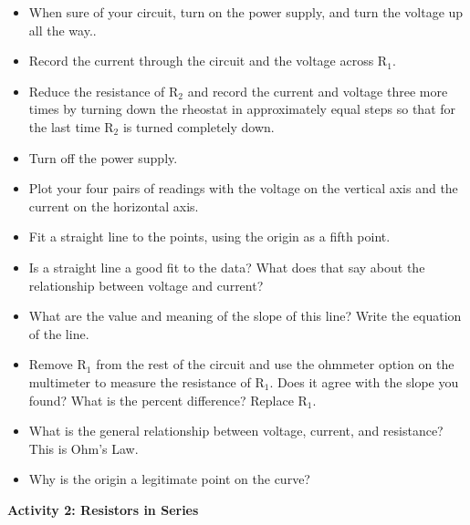 \begin{itemize}
\item When sure of your circuit, turn on the power supply, and turn
the voltage up all the way..
\item Record the current through the circuit and the voltage across R\( _{1} \).\vspace{10mm}

\item Reduce the resistance of R\( _{2} \) and record the current and voltage
three more times by turning down the rheostat in approximately equal
steps so that for the last time R\( _{2} \) is turned completely down.\vspace{30mm}

\item Turn off the power supply.
\item Plot your four pairs of readings with the voltage on the vertical axis
and the current on the horizontal axis.
\item Fit a straight line to the points, using the origin as a fifth point.
\item Is a straight line a good fit to the data? What does that say about
the relationship between voltage and current?\vspace{15mm}

\item What are the value and meaning of the slope of this line? Write the
equation of the line.\vspace{15mm}

\item Remove R\( _{1} \) from the rest of the circuit and use the ohmmeter
option on the multimeter to measure the resistance of R\( _{1} \).
Does it agree with the slope you found? What is the percent difference?
Replace R\( _{1} \).\vspace{30mm}

\item What is the general relationship between voltage, current, and resistance?
This is Ohm's Law.\vspace{15mm}

\item Why is the origin a legitimate point on the curve?\vspace{15mm}

\end{itemize}
\textbf{Activity 2: Resistors in Series}

